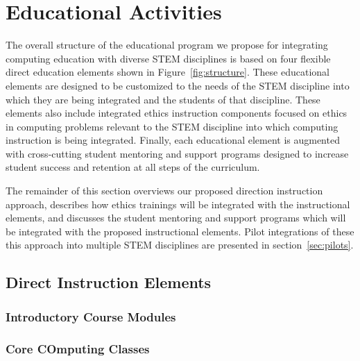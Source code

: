 \section{Educational Activities}
\label{sec:approach}

The overall structure of the educational program we propose for integrating computing education with diverse STEM disciplines is based on four flexible direct education elements shown in Figure~\ref{fig:structure}.  These educational elements are designed to be customized to the needs of the STEM discipline into which they are being integrated and the students of that discipline.  These elements also include integrated ethics instruction components focused on ethics in computing problems relevant to the STEM discipline into which computing instruction is being integrated. Finally, each educational element is augmented with cross-cutting student mentoring and support programs designed to increase student success and retention at all steps of the curriculum. 

The remainder of this section overviews our proposed direction instruction approach, describes how ethics trainings will be integrated with the instructional elements, and discusses the student mentoring and support programs which will be integrated with the proposed instructional elements.  Pilot integrations of these this approach into multiple STEM disciplines are presented in section~\ref{sec:pilots}.

\subsection{Direct Instruction Elements}


\subsubsection{Introductory Course Modules}

\subsubsection{Core COmputing Classes}

